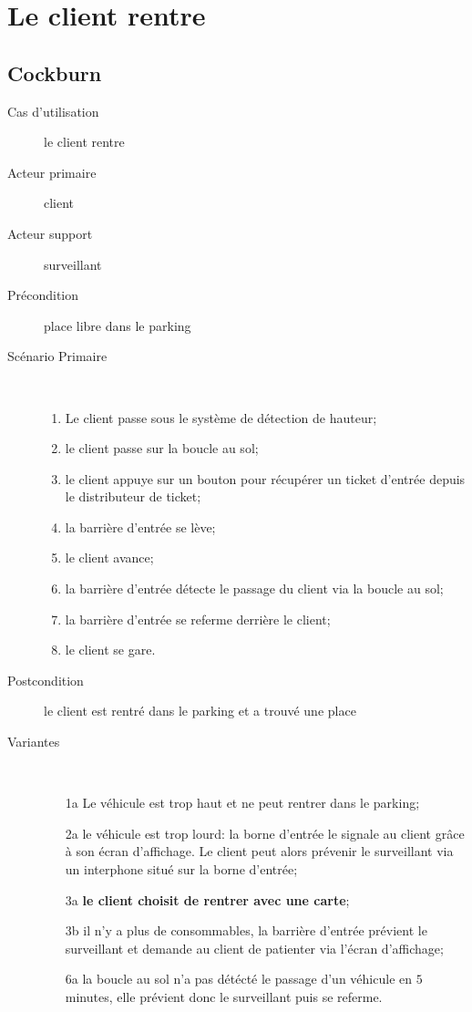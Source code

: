 \documentclass[a4paper]{article}
\begin{document}
\newpage

\section{Le client rentre}
\subsection{Cockburn}
\begin{description}
	\item[Cas d'utilisation] le client rentre
	\item[Acteur primaire] client
	\item[Acteur support] surveillant
	\item[Pr\'econdition] place libre dans le parking
	\item[Sc\'enario Primaire] \
	\begin{enumerate}
		\item Le client passe sous le syst\`eme de d\'etection de hauteur;
		\item le client passe sur la boucle au sol;
		\item le client appuye sur un bouton pour r\'ecup\'erer un ticket d'entr\'ee depuis
			le distributeur de ticket;
		\item la barri\`ere d'entrée se l\`eve;
		\item le client avance;
		\item la barri\`ere d'entrée d\'etecte le passage du client via la boucle au sol;
		\item la barri\`ere d'entrée se referme derri\`ere le client;
		\item le client se gare.
	\end{enumerate}
	\item[Postcondition] le client est rentr\'e dans le parking et a trouv\'e une place
	\item[Variantes] \
	\begin{enumerate}
		\item[1a] Le v\'ehicule est trop haut et ne peut rentrer dans
			le parking;
		\item[2a] le v\'ehicule est trop lourd: la borne d'entr\'ee le signale au client gr\^ace
                        \`a son \'ecran d'affichage. Le client peut alors pr\'evenir le 
                        surveillant via un interphone situ\'e sur la borne d'entr\'ee;
		\item[3a] \textbf{le client choisit de rentrer avec une carte};
		\item[3b] il n'y a plus de consommables, la barri\`ere d'entr\'ee pr\'evient
			le surveillant et demande au client de patienter via l'\'ecran d'affichage;
		\item[6a] la boucle au sol n'a pas d\'et\'ect\'e le passage d'un v\'ehicule
			en $5$ minutes, elle pr\'evient donc le surveillant puis se referme.
	\end{enumerate}
\end{description}
\end{document}
